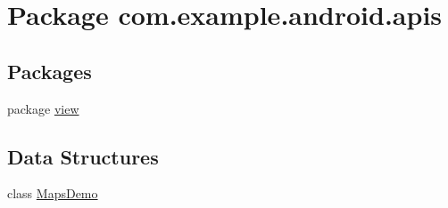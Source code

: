 \hypertarget{namespacecom_1_1example_1_1android_1_1apis}{\section{Package com.\-example.\-android.\-apis}
\label{namespacecom_1_1example_1_1android_1_1apis}
}
\subsection*{Packages}
\begin{DoxyCompactItemize}
\item 
package \hyperlink{namespacecom_1_1example_1_1android_1_1apis_1_1view}{view}
\end{DoxyCompactItemize}
\subsection*{Data Structures}
\begin{DoxyCompactItemize}
\item 
class \hyperlink{classcom_1_1example_1_1android_1_1apis_1_1_maps_demo}{Maps\-Demo}
\end{DoxyCompactItemize}
